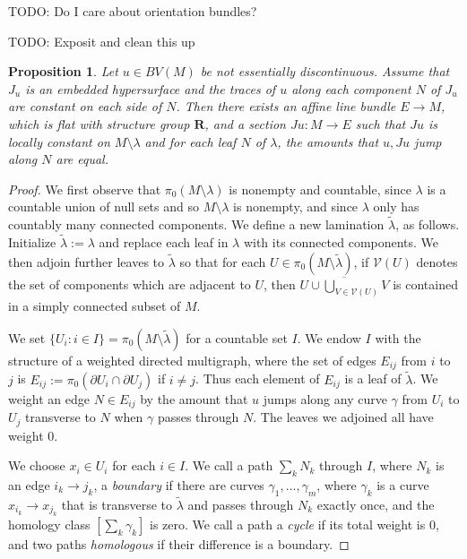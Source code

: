 \documentclass[reqno,11pt]{amsart}
\newcommand{\RR}{\mathbf{R}}
\newcommand{\dfn}[1]{\emph{#1}\index{#1}}
\newtheorem{proposition}[theorem]{Proposition}
\theoremstyle{definition}
\numberwithin{equation}{section}
\begin{document}
TODO: Do I care about orientation bundles?

TODO: Exposit and clean this up

\begin{proposition}\label{existence of jump graphs}
Let $u \in BV(M)$ be not essentially discontinuous.
Assume that $J_u$ is an embedded hypersurface and the traces of $u$ along each component $N$ of $J_u$ are constant on each side of $N$.
Then there exists an affine line bundle $E \to M$, which is flat with structure group $\RR$, and a section $Ju: M \to E$ such that $Ju$ is locally constant on $M \setminus \lambda$ and for each leaf $N$ of $\lambda$, the amounts that $u, Ju$ jump along $N$ are equal.
\end{proposition}
\begin{proof}
We first observe that $\pi_0(M \setminus \lambda)$ is nonempty and countable, since $\lambda$ is a countable union of null sets and so $M \setminus \lambda$ is nonempty, and since $\lambda$ only has countably many connected components.
We define a new lamination $\tilde \lambda$, as follows. Initialize $\tilde \lambda := \lambda$ and replace each leaf in $\lambda$ with its connected components.
We then adjoin further leaves to $\tilde \lambda$ so that for each $U \in \pi_0(M \setminus \tilde \lambda)$, if $\mathcal V(U)$ denotes the set of components which are adjacent to $U$, then $\overline{U \cup \bigcup_{V \in \mathcal V(U)} V}$ is contained in a simply connected subset of $M$.

We set $\{U_i: i \in I\} = \pi_0(M \setminus \tilde \lambda)$ for a countable set $I$.
We endow $I$ with the structure of a weighted directed multigraph, where the set of edges $E_{ij}$ from $i$ to $j$ is $E_{ij} := \pi_0(\partial U_i \cap \partial U_j)$ if $i \neq j$.
Thus each element of $E_{ij}$ is a leaf of $\tilde \lambda$.
We weight an edge $N \in E_{ij}$ by the amount that $u$ jumps along any curve $\gamma$ from $U_i$ to $U_j$ transverse to $N$ when $\gamma$ passes through $N$.
The leaves we adjoined all have weight $0$.

We choose $x_i \in U_i$ for each $i \in I$.
We call a path $\sum_k N_k$ through $I$, where $N_k$ is an edge $i_k \to j_k$, a \dfn{boundary} if there are curves $\gamma_1, \dots, \gamma_m$, where $\gamma_k$ is a curve $x_{i_k} \to x_{j_k}$ that is transverse to $\tilde \lambda$ and passes through $N_k$ exactly once, and the homology class $[\sum_k \gamma_k]$ is zero.
We call a path a \dfn{cycle} if its total weight is $0$, and two paths \dfn{homologous} if their difference is a boundary.


\end{proof}
\end{document}
